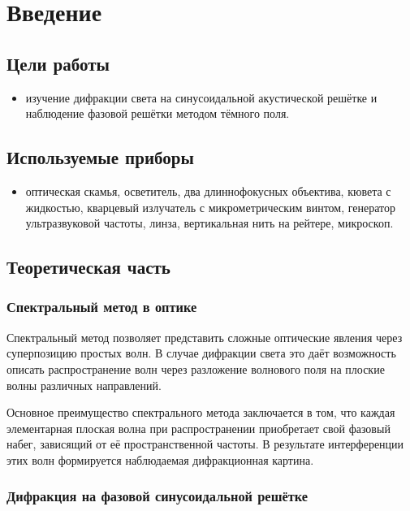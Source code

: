 \section{Введение}
\subsection{Цели работы} 
\begin{itemize}
    \item изучение дифракции света на синусоидальной акустической решётке и наблюдение фазовой решётки методом тёмного поля.
\end{itemize}

\subsection{Используемые приборы}
\begin{itemize}
    \item оптическая скамья, осветитель, два длиннофокусных объектива, кювета с жидкостью, кварцевый излучатель с микрометрическим винтом, генератор ультразвуковой частоты, линза, вертикальная нить на рейтере, микроскоп.
\end{itemize}

\subsection{Теоретическая часть}

\subsubsection{Спектральный метод в оптике}

Спектральный метод позволяет представить сложные оптические явления через суперпозицию простых волн. В случае дифракции света это даёт возможность описать распространение волн через разложение волнового поля на плоские волны различных направлений.

Основное преимущество спектрального метода заключается в том, что каждая элементарная плоская волна при распространении приобретает свой фазовый набег, зависящий от её пространственной частоты. В результате интерференции этих волн формируется наблюдаемая дифракционная картина.

\subsubsection{Дифракция на фазовой синусоидальной решётке}

